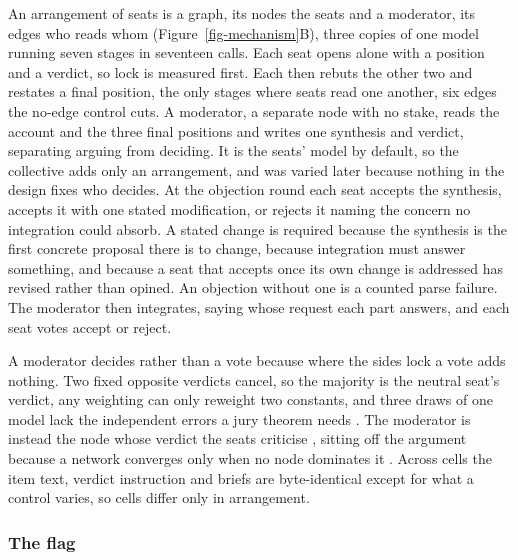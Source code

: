 An arrangement of seats is a graph, its nodes the seats and a moderator,
its edges who reads whom (Figure~\ref{fig-mechanism}B), three copies of
one model running seven stages in seventeen
calls.
Each seat opens alone with a position and a verdict, so lock is measured
first.
Each then rebuts the other two and restates a final position, the only
stages where seats read one another, six edges the no-edge control
cuts.
A moderator, a separate node with no stake, reads the account and the
three final positions and writes one synthesis and verdict, separating
arguing from
deciding.
It is the seats' model by default, so the collective adds only an
arrangement, and was varied later because nothing in the design fixes who
decides.
At the objection round each seat accepts the synthesis, accepts it with
one stated modification, or rejects it naming the concern no integration
could
absorb.
A stated change is required because the synthesis is the first concrete
proposal there is to change, because integration must answer something,
and because a seat that accepts once its own change is addressed has
revised rather than opined. An objection without one is a counted
parse
failure.
The moderator then integrates, saying whose request each part answers,
and each seat votes accept or
reject.

A moderator decides rather than a vote because where the sides lock a
vote adds nothing. Two fixed opposite verdicts cancel, so the majority is
the neutral seat's verdict, any weighting
\citep{shapley1984optimizing} can only reweight two constants, and three
draws of one model lack the independent errors a jury theorem needs
\citep{ladha1992condorcet}.
The moderator is instead the node whose verdict the seats criticise
\citep{mercier2011argumentative,longino1990science}, sitting off the
argument because a network converges only when no node dominates it
\citep{golub2010naive}.
Across cells the item text, verdict instruction and briefs are
byte-identical except for what a control varies, so cells differ only in
arrangement.

\subsubsection{The flag}
\label{sec-method-flag}

